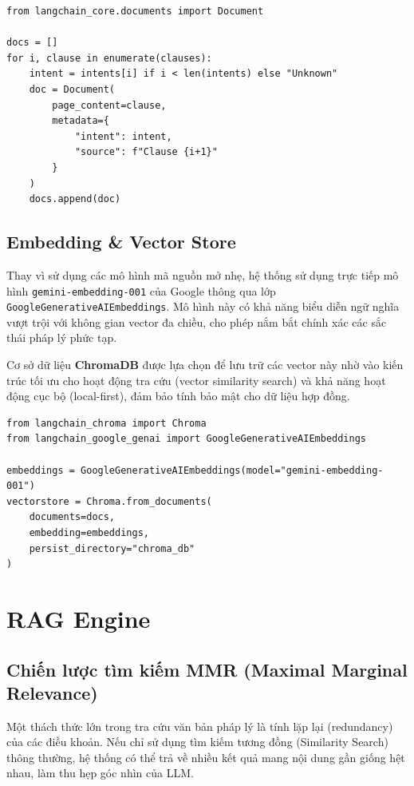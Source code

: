 \begin{verbatim}
from langchain_core.documents import Document

docs = []
for i, clause in enumerate(clauses):
    intent = intents[i] if i < len(intents) else "Unknown"
    doc = Document(
        page_content=clause,
        metadata={
            "intent": intent, 
            "source": f"Clause {i+1}"
        }
    )
    docs.append(doc)
\end{verbatim}

\subsection{Embedding \& Vector Store}
Thay vì sử dụng các mô hình mã nguồn mở nhẹ, hệ thống sử dụng trực tiếp mô hình \texttt{gemini-embedding-001} của Google thông qua lớp \texttt{GoogleGenerativeAIEmbeddings}. Mô hình này có khả năng biểu diễn ngữ nghĩa vượt trội với không gian vector đa chiều, cho phép nắm bắt chính xác các sắc thái pháp lý phức tạp.

Cơ sở dữ liệu \textbf{ChromaDB} được lựa chọn để lưu trữ các vector này nhờ vào kiến trúc tối ưu cho hoạt động tra cứu (vector similarity search) và khả năng hoạt động cục bộ (local-first), đảm bảo tính bảo mật cho dữ liệu hợp đồng.

\begin{verbatim}
from langchain_chroma import Chroma
from langchain_google_genai import GoogleGenerativeAIEmbeddings

embeddings = GoogleGenerativeAIEmbeddings(model="gemini-embedding-001")
vectorstore = Chroma.from_documents(
    documents=docs,
    embedding=embeddings,
    persist_directory="chroma_db"
)
\end{verbatim}

\section{RAG Engine}

\subsection{Chiến lược tìm kiếm MMR (Maximal Marginal Relevance)}
Một thách thức lớn trong tra cứu văn bản pháp lý là tính lặp lại (redundancy) của các điều khoản. Nếu chỉ sử dụng tìm kiếm tương đồng (Similarity Search) thông thường, hệ thống có thể trả về nhiều kết quả mang nội dung gần giống hệt nhau, làm thu hẹp góc nhìn của LLM.


